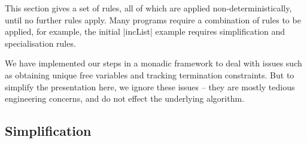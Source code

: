 \documentclass{sigplanconf}
\begin{document}
This section gives a set of rules, all of which are applied non-deterministically, until no further rules apply. Many programs require a combination of rules to be applied, for example, the initial |incList| example requires simplification and specialisation rules.

We have implemented our steps in a monadic framework to deal with issues such as obtaining unique free variables and tracking termination constraints. But to simplify the presentation here, we ignore these issues -- they are mostly tedious engineering concerns, and do not effect the underlying algorithm.

\subsection{Simplification}
\label{sec:simplification_detail}
\end{document}
